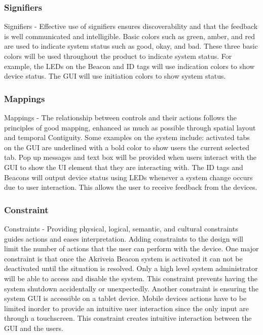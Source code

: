 \subsubsection{Signifiers}
Signifiers - Effective use of signifiers ensures discoverability and that the feedback is well communicated and intelligible. Basic colors such as green, amber, and red are used to indicate system status such as good, okay, and bad. These three basic colors will be used throughout the product to indicate system status. For example, the LEDs on the Beacon and ID tags will use indication colors to show device status. The GUI will use initiation colors to show system status.
\medskip

\subsubsection{Mappings}
Mappings - The relationship between controls and their actions follows the principles of good mapping, enhanced as much as possible through spatial layout and temporal Contiguity. Some examples on the system include: activated tabs on the GUI are underlined with a bold color to show users the current selected tab. Pop up messages and text box will be provided when users interact with the GUI to show the UI element that they are interacting with. The ID tags and Beacons will output device status using LEDs whenever a system change occurs due to user interaction. This allows the user to receive feedback from the devices.
\medskip

\subsubsection{Constraint}
Constraints - Providing physical, logical, semantic, and cultural constraints guides actions and eases interpretation. Adding constraints to the design will limit the number of actions that the user can perform with the device. One major constraint is that once the Akriveia Beacon system is activated it can not be deactivated until the situation is resolved. Only a high level system administrator will be able to access and disable the system. This constraint prevents having the system shutdown accidentally or unexpectedly. Another constraint is ensuring the system GUI is accessible on a tablet device. Mobile devices actions have to be limited inorder to provide an intuitive user interaction since the only input are through a touchscreen. This constraint creates intuitive interaction between the GUI and the users.

